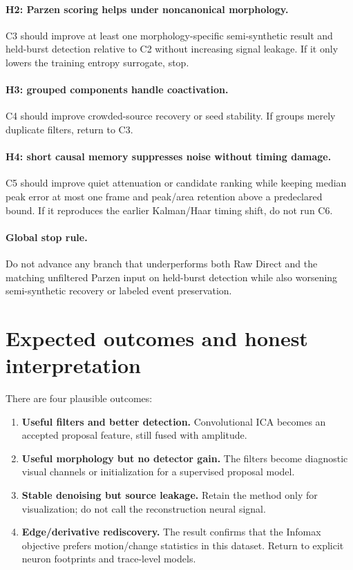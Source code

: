 \documentclass[11pt]{article}
\begin{document}
\paragraph{H2: Parzen scoring helps under noncanonical morphology.}
C3 should improve at least one morphology-specific semi-synthetic result and
held-burst detection relative to C2 without increasing signal leakage. If it
only lowers the training entropy surrogate, stop.

\paragraph{H3: grouped components handle coactivation.}
C4 should improve crowded-source recovery or seed stability. If groups merely
duplicate filters, return to C3.

\paragraph{H4: short causal memory suppresses noise without timing damage.}
C5 should improve quiet attenuation or candidate ranking while keeping median
peak error at most one frame and peak/area retention above a predeclared bound.
If it reproduces the earlier Kalman/Haar timing shift, do not run C6.

\paragraph{Global stop rule.}
Do not advance any branch that underperforms both Raw Direct and the matching
unfiltered Parzen input on held-burst detection while also worsening
semi-synthetic recovery or labeled event preservation.

\section{Expected outcomes and honest interpretation}

There are four plausible outcomes:
\begin{enumerate}[leftmargin=*]
\item \textbf{Useful filters and better detection.} Convolutional ICA becomes an
accepted proposal feature, still fused with amplitude.
\item \textbf{Useful morphology but no detector gain.} The filters become
diagnostic visual channels or initialization for a supervised proposal model.
\item \textbf{Stable denoising but source leakage.} Retain the method only for
visualization; do not call the reconstruction neural signal.
\item \textbf{Edge/derivative rediscovery.} The result confirms that the
Infomax objective prefers motion/change statistics in this dataset. Return to
explicit neuron footprints and trace-level models.
\end{enumerate}
\end{document}

